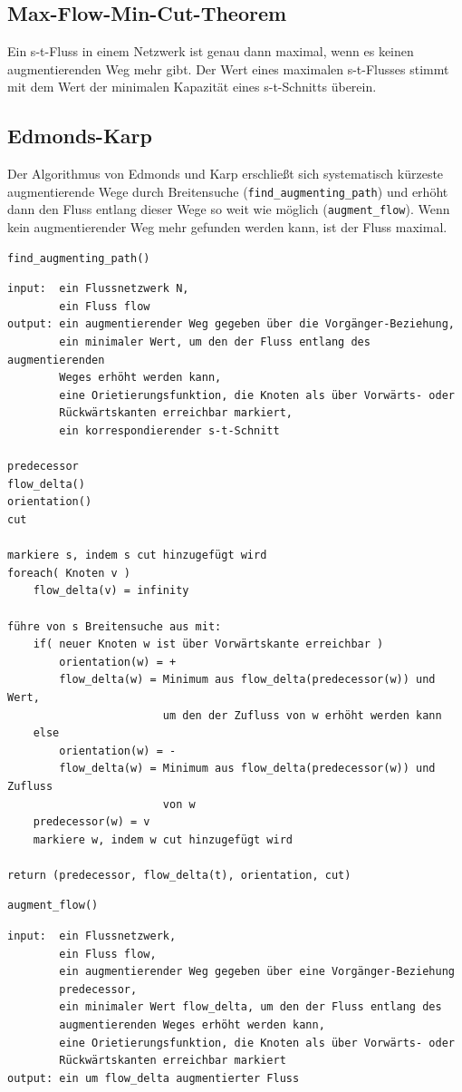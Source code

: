 \documentclass[10pt,a4paper,landscape]{article}
\begin{document}
\begin{multicols*}{2}
    \subsection{ Max-Flow-Min-Cut-Theorem }
    Ein s-t-Fluss in einem Netzwerk ist genau dann maximal, wenn es keinen augmentierenden Weg mehr gibt. Der Wert eines maximalen s-t-Flusses stimmt mit dem Wert 
    der minimalen Kapazität eines s-t-Schnitts überein.

    \subsection{ Edmonds-Karp }
    Der Algorithmus von Edmonds und Karp erschließt sich systematisch kürzeste augmentierende Wege durch Breitensuche (\verb|find_augmenting_path|) und erhöht dann den Fluss entlang dieser Wege so 
    weit wie möglich (\verb|augment_flow|). Wenn kein augmentierender Weg mehr gefunden werden kann, ist der Fluss maximal.

    \large
\begin{verbatim}
find_augmenting_path()
    \end{verbatim}
    \small
\begin{verbatim}
input:  ein Flussnetzwerk N,
        ein Fluss flow
output: ein augmentierender Weg gegeben über die Vorgänger-Beziehung,
        ein minimaler Wert, um den der Fluss entlang des augmentierenden 
        Weges erhöht werden kann,
        eine Orietierungsfunktion, die Knoten als über Vorwärts- oder 
        Rückwärtskanten erreichbar markiert,
        ein korrespondierender s-t-Schnitt

predecessor
flow_delta()
orientation()
cut

markiere s, indem s cut hinzugefügt wird
foreach( Knoten v )
    flow_delta(v) = infinity

führe von s Breitensuche aus mit:
    if( neuer Knoten w ist über Vorwärtskante erreichbar )
        orientation(w) = +
        flow_delta(w) = Minimum aus flow_delta(predecessor(w)) und Wert, 
                        um den der Zufluss von w erhöht werden kann
    else
        orientation(w) = -
        flow_delta(w) = Minimum aus flow_delta(predecessor(w)) und Zufluss 
                        von w
    predecessor(w) = v
    markiere w, indem w cut hinzugefügt wird

return (predecessor, flow_delta(t), orientation, cut)
    \end{verbatim}
\normalsize

    \large
\begin{verbatim}
augment_flow()
    \end{verbatim}
    \small
\begin{verbatim}
input:  ein Flussnetzwerk,
        ein Fluss flow,
        ein augmentierender Weg gegeben über eine Vorgänger-Beziehung 
        predecessor,
        ein minimaler Wert flow_delta, um den der Fluss entlang des 
        augmentierenden Weges erhöht werden kann,
        eine Orietierungsfunktion, die Knoten als über Vorwärts- oder 
        Rückwärtskanten erreichbar markiert
output: ein um flow_delta augmentierter Fluss


\end{verbatim}
\end{multicols*}
\end{document}
